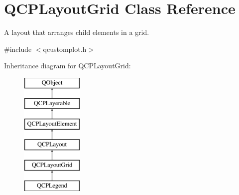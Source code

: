 \hypertarget{class_q_c_p_layout_grid}{}\section{Q\+C\+P\+Layout\+Grid Class Reference}
\label{class_q_c_p_layout_grid}


A layout that arranges child elements in a grid.  




{\ttfamily \#include $<$qcustomplot.\+h$>$}

Inheritance diagram for Q\+C\+P\+Layout\+Grid\+:\begin{figure}[H]
\begin{center}
\leavevmode
\includegraphics[height=6.000000cm]{class_q_c_p_layout_grid}
\end{center}
\end{figure}
